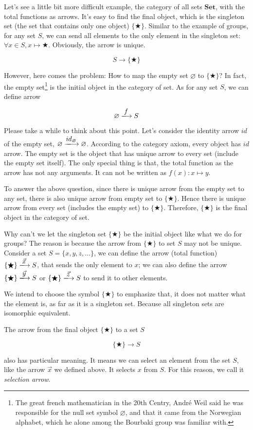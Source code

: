 \documentclass{article}
\begin{document}
\begin{example}
\normalfont
Let's see a little bit more difficult example, the category of all sets $\pmb{Set}$, with the total functions as arrows. It's easy to find the final object, which is the singleton set (the set that contains only one object) $\{ \bigstar \}$. Similar to the example of groups, for any set $S$, we can send all elements to the only element in the singleton set: $\forall x \in S, x \mapsto \bigstar$. Obviously, the arrow is unique.

\[
  S \longrightarrow \{ \bigstar \}
\]

However, here comes the problem: How to map the empty set $\varnothing$ to $\{ \bigstar \}$? In fact, the empty set\footnote{The great french mathematician in the 20th Centry, André Weil said he was responsible for the null set symbol $\varnothing$, and that it came from the Norwegian alphabet, which he alone among the Bourbaki group was familiar with.} is the initial object in the category of set. As for any set $S$, we can define arrow

\[
  \varnothing \arrowto{f} S
\]

Please take a while to think about this point. Let's consider the identity arrow $id$ of the empty set, $\varnothing \arrowto{id_{\varnothing}} \varnothing$. According to the category axiom, every object has $id$ arrow. The empty set is the object that has unique arrow to every set (include the empty set itself). The only special thing is that, the total function as the arrow has not any arguments. It can not be written as $f(x): x \mapsto y$.

To answer the above question, since there is unique arrow from the empty set to any set, there is also unique arrow from empty set to $\{ \bigstar \}$. Hence there is unique arrow from every set (includes the empty set) to $\{ \bigstar \}$. Therefore, $\{ \bigstar \}$ is the final object in the category of set.

Why can't we let the singleton set $\{ \bigstar \}$ be the initial object like what we do for groups? The reason is because the arrow from $\{ \bigstar \}$ to set $S$ may not be unique. Consider a set $S = \{x, y, z, ...\}$, we can define the arrow (total function) $\{ \bigstar \} \arrowto{\vec{x}} S$, that sends the only element to $x$; we can also define the arrow $\{ \bigstar \} \arrowto{\vec{y}} S$ or $\{ \bigstar \} \arrowto{\vec{z}} S$ to send it to other elements.

We intend to choose the symbol $\{ \bigstar \}$ to emphasize that, it does not matter what the element is, as far as it is a singleton set. Because all singleton sets are isomorphic equivalent.

\label{sec:selection-arrow} 
The arrow from the final object $\{ \bigstar \}$ to a set $S$

\[
  \{ \bigstar \} \longrightarrow S
\]

also has particular meaning. It means we can select an element from the set $S$, like the arrow $\vec{x}$ we defined above. It selects $x$ from $S$. For this reason, we call it {\em selection arrow}.
\end{example}
\end{document}
